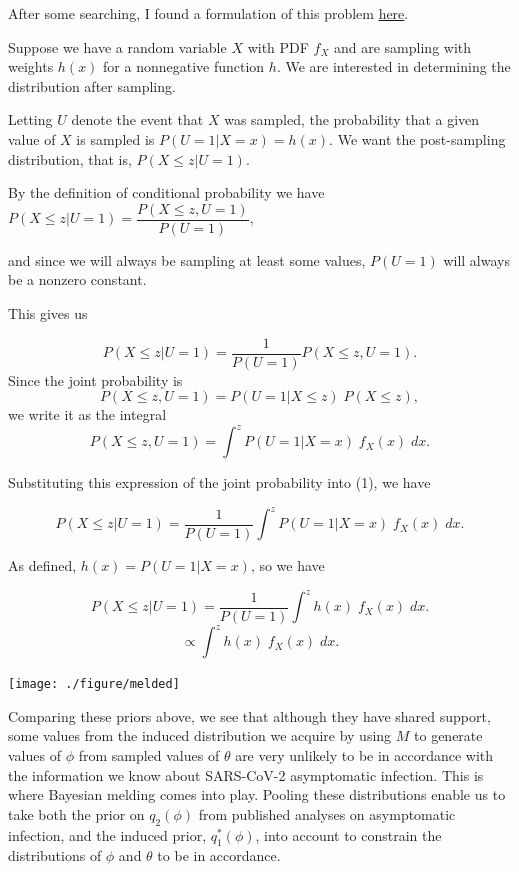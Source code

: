 \documentclass[12pt,twoside]{smiththesis}
\begin{document}
After some searching, I found a formulation of this problem \href{https://stats.stackexchange.com/questions/599440/density-of-sampled-exponential-data-with-sampling-weights-proportional-to-x-its}{here}.

Suppose we have a random variable \(X\) with PDF \(f_X\) and are sampling with weights \(h(x)\) for a nonnegative function \(h\). We are interested in determining the distribution after sampling.

Letting \(U\) denote the event that \(X\) was sampled, the probability that a given value of \(X\) is sampled is \(P(U=1|X=x) = h(x)\). We want the post-sampling distribution, that is, \(P(X \leq z | U = 1)\).

By the definition of conditional probability we have \(P(X \leq z | U = 1) = \dfrac{P(X \leq z , U = 1)}{ P(U=1)}\),

and since we will always be sampling at least some values, \(P(U=1)\) will always be a nonzero constant.

This gives us

\[P(X \leq z | U = 1) = \dfrac{1}{ P(U=1)} P(X \leq z , U = 1) \tag{1}.\]
Since the joint probability is \[P(X \leq z, U= 1) = P(U=1|X\leq z) \; P(X\leq z),\] we write it as the integral \[P(X \leq z, U = 1) = \int^z P(U=1|X=x) \; f_X(x) \; dx.\]

Substituting this expression of the joint probability into (1), we have

\[P(X \leq z | U = 1) = \dfrac{1}{ P(U=1)} \int^z P(U=1|X=x) \; f_X(x) \; dx.\]

As defined, \(h(x) = P(U=1|X=x)\), so we have

\[P(X \leq z | U = 1) = \dfrac{1}{ P(U=1)} \int^z h(x) \; f_X(x) \; dx.\]
\[ \propto \int^z h(x) \; f_X(x) \; dx.\]

\texttt{[image: ./figure/melded]}

Comparing these priors above, we see that although they have shared support, some values from the induced distribution we acquire by using \(M\) to generate values of \(\phi\) from sampled values of \(\theta\) are very unlikely to be in accordance with the information we know about SARS-CoV-2 asymptomatic infection. This is where Bayesian melding comes into play. Pooling these distributions enable us to take both the prior on \(q_2(\phi)\) from published analyses on asymptomatic infection, and the induced prior, \(q_1^*(\phi)\), into account to constrain the distributions of \(\phi\) and \(\theta\) to be in accordance.
\end{document}
